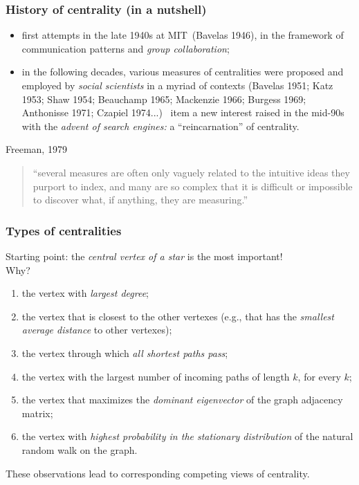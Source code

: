 \begin{frame}
  \frametitle{History of centrality (in a nutshell)}
  \begin{itemize}
    \pause
    \item first attempts in the late 1940s at MIT~(Bavelas 1946), in the
      framework of communication patterns and \emph{group collaboration};
    \pause
    \item in the following decades, various measures of centralities were
      proposed and employed by \emph{social scientists} in a myriad of contexts
      (Bavelas 1951; Katz 1953; Shaw 1954; Beauchamp 1965; Mackenzie 1966;
      Burgess 1969; Anthonisse 1971; Czapiel 1974...)
    \pause\
    item a new interest raised in the mid-90s with the \emph{advent of search
    engines:} a ``reincarnation'' of centrality.
  \end{itemize}
  \pause
  \begin{block}{Freeman, 1979}
    \begin{quotation}
      ``several measures are often only vaguely related to the intuitive ideas
      they purport to index, and many are so complex that it is difficult or
      impossible to discover what, if anything, they are measuring.''
    \end{quotation}
  \end{block}
\end{frame}

\begin{frame}
  \frametitle{Types of centralities}
  Starting point: the \emph{central vertex of a star} is the most important!\\
  \qquad Why?
  \pause
  \begin{enumerate}
    \item the vertex with \emph{largest degree};
    \item the vertex that is closest to the other vertexes (e.g., that has the
      \emph{smallest average distance} to other vertexes);
    \item the vertex through which \emph{all shortest paths pass};
    \item the vertex with the largest number of incoming paths of length $k$,
      for every $k$;
    \item the vertex that maximizes the \emph{dominant eigenvector} of the graph
      adjacency matrix;
    \item the vertex with \emph{highest probability in the stationary
      distribution} of the natural random walk on the graph.
  \end{enumerate}
  \pause
  These observations lead to corresponding competing views of centrality.
\end{frame}

